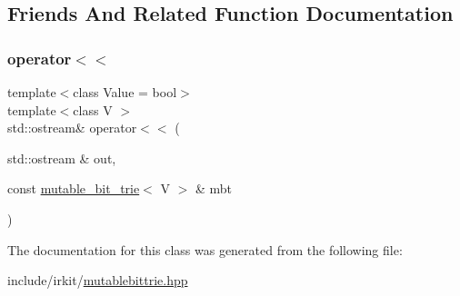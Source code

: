\subsection{Friends And Related Function Documentation}
\mbox{\label{classirk_1_1mutable__bit__trie_a91e672d5695fe80b17bbfd474d593ec2}} 
\subsubsection{\texorpdfstring{operator$<$$<$}{operator<<}}
{\footnotesize\ttfamily template$<$class Value = bool$>$ \\
template$<$class V $>$ \\
std\+::ostream\& operator$<$$<$ (\begin{DoxyParamCaption}\item[{std\+::ostream \&}]{out,  }\item[{const \mbox{\hyperlink{classirk_1_1mutable__bit__trie}{mutable\+\_\+bit\+\_\+trie}}$<$ V $>$ \&}]{mbt }\end{DoxyParamCaption})\hspace{0.3cm}{\ttfamily [friend]}}



The documentation for this class was generated from the following file\+:\begin{DoxyCompactItemize}
\item 
include/irkit/\mbox{\hyperlink{mutablebittrie_8hpp}{mutablebittrie.\+hpp}}\end{DoxyCompactItemize}
